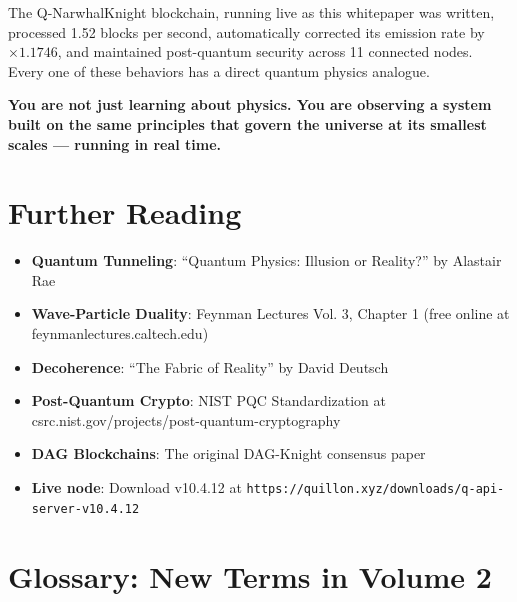 \documentclass[11pt,a4paper]{article}
\begin{document}
\vspace{0.5cm}

The Q-NarwhalKnight blockchain, running live as this whitepaper was written, processed 1.52 blocks per second, automatically corrected its emission rate by $\times 1.1746$, and maintained post-quantum security across 11 connected nodes. Every one of these behaviors has a direct quantum physics analogue.

\textbf{You are not just learning about physics. You are observing a system built on the same principles that govern the universe at its smallest scales --- running in real time.}

\section*{Further Reading}

\begin{itemize}
    \item \textbf{Quantum Tunneling}: ``Quantum Physics: Illusion or Reality?'' by Alastair Rae
    \item \textbf{Wave-Particle Duality}: Feynman Lectures Vol. 3, Chapter 1 (free online at feynmanlectures.caltech.edu)
    \item \textbf{Decoherence}: ``The Fabric of Reality'' by David Deutsch
    \item \textbf{Post-Quantum Crypto}: NIST PQC Standardization at csrc.nist.gov/projects/post-quantum-cryptography
    \item \textbf{DAG Blockchains}: The original DAG-Knight consensus paper
    \item \textbf{Live node}: Download v10.4.12 at \texttt{https://quillon.xyz/downloads/q-api-server-v10.4.12}
\end{itemize}

\section*{Glossary: New Terms in Volume 2}
\end{document}
